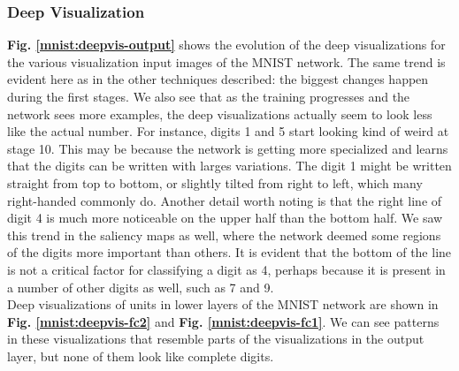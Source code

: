 \begin{comment}
The visualizations show the pattern in the visualization image that was responsible for eliciting activations in the specific feature map. This pattern can reveal what a certain part of the network finds important and what it is looking for in an image. The tools of the figures are linked together similar to the saliency map figures. Additionally, if you click the save tool, all of the deconvolutional visualizations will be downloaded.
\end{comment}

\subsubsection{Deep Visualization}

\textbf{Fig. \ref{mnist:deepvis-output}} shows the evolution of the deep visualizations for the various visualization input images of the MNIST network. The same trend is evident here as in the other techniques described: the biggest changes happen during the first stages. We also see that as the training progresses and the network sees more examples, the deep visualizations actually seem to look less like the actual number. For instance, digits 1 and 5 start looking kind of weird at stage 10. This may be because the network is getting more specialized and learns that the digits can be written with larges variations. The digit 1 might be written straight from top to bottom, or slightly tilted from right to left, which many right-handed commonly do. Another detail worth noting is that the right line of digit 4 is much more noticeable on the upper half than the bottom half. We saw this trend in the saliency maps as well, where the network deemed some regions of the digits more important than others. It is evident that the bottom of the line is not a critical factor for classifying a digit as 4, perhaps because it is present in a number of other digits as well, such as 7 and 9.\\

\noindent Deep visualizations of units in lower layers of the MNIST network are shown in \textbf{Fig. \ref{mnist:deepvis-fc2}} and \textbf{Fig. \ref{mnist:deepvis-fc1}}. We can see patterns in these visualizations that resemble parts of the visualizations in the output layer, but none of them look like complete digits. \\


